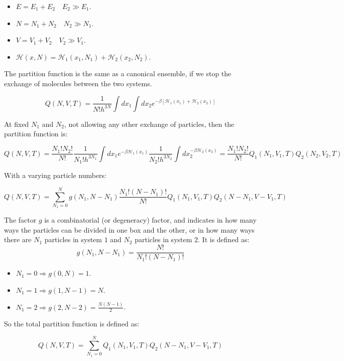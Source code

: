 \begin{multicols}{2}
	\begin{itemize}
		\item $E = E_1 + E_2\quad E_2\gg E_1$.
		\item $N = N_1 + N_2\quad N_2\gg N_1$.
		\item $V = V_1 + V_2\quad V_2\gg V_1$.
		\item $\mathcal{H}(x, N) = \mathcal{H}_1(x_1, N_1) + \mathcal{H}_2(x_2, N_2)$.
	\end{itemize}
\end{multicols}

The partition function is the same as a canonical ensemble, if we stop the exchange of molecules between the two systems.

$$Q(N, V, T) = \frac{1}{N!h^{3N}}\int dx_1\int dx_2e^{-\beta[\mathcal{H}_1(x_1) + \mathcal{H}_2(x_2)]}$$

At fixed $N_1$ and $N_2$, not allowing any other exchange of particles, then the partition function is:

$$Q(N, V, T) = \frac{N_1!N_2!}{N!}\frac{1}{N_1!h^{3N_1}}\int dx_1 e^{-\beta\mathcal{H}_1(x_1)}\frac{1}{N_2!h^{3N_2}}\int dx_2^{-\beta\mathcal{H}_2(x_2)} = \frac{N_1!N_2!}{N!}Q_1(N_1, V_1, T)Q_2(N_2, V_2, T)$$

With a varying particle numbers:

$$Q(N, V, T) = \sum\limits_{N_1=0}^Ng(N_1, N-N_1)\frac{N_1!(N-N_1)!}{N!}Q_1(N_1, V_1, T)Q_2(N-N_1, V-V_1, T)$$

The factor $g$ is a combinatorial (or degeneracy) factor, and indicates in how many ways the particles can be divided in one box and the other, or in how many ways there are $N_1$ particles in system $1$ and $N_2$ particles in system $2$.
It is defined as:
$$g(N_1, N-N_1) = \frac{N!}{N_1!(N-N_1)!}$$

\begin{multicols}{3}
	\begin{itemize}
		\item $N_1 = 0\Rightarrow g(0, N) = 1$.
		\item $N_1 = 1\Rightarrow g(1, N-1) = N$.
		\item $N_1 = 2\Rightarrow g(2, N-2) = \frac{N(N-1)}{2}$.
	\end{itemize}
\end{multicols}

So the total partition function is defined as:

$$Q(N, V, T) = \sum\limits_{N_1=0}^NQ_1(N_1, V_1, T)Q_2(N-N_1, V-V_1, T)$$

